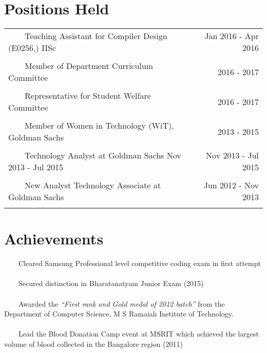 \documentclass[a4paper,10pt]{article} %
\newcommand{\tabitem}{~~\llap{\textbullet}~~}
\begin{document}

\section{Positions Held}

\begin{tabular}{p{12cm}r}
\tabitem Teaching Assistant for Compiler Design (E0256,) IISc  & Jan 2016 - Apr 2016 \\
&\\
\tabitem Member of Department Curriculum Committee &  2016 - 2017\\
&\\
\tabitem Representative for Student Welfare Committee  & 2016 - 2017\\
&\\
\tabitem Member of Women in Technology (WiT), Goldman Sachs  & 2013 - 2015\\
&\\
\tabitem Technology Analyst at Goldman Sachs Nov 2013 - Jul 2015 & Nov 2013 - Jul 2015 \\
&\\
\tabitem New Analyst Technology Associate at Goldman Sachs & Jun 2012 - Nov 2013 \\
&\\
\end{tabular}



\section{Achievements}
\tabitem Cleared Samsung Professional level competitive coding exam in first 
attempt \\
\\
\tabitem Secured distinction in Bharatanatyam Junior Exam (2015)  \\
\\
\tabitem Awarded the \textit{“First rank and Gold medal of 2012 batch”} from 
the Department of Computer Science, M S Ramaiah Institute of Technology.\\
\\
\tabitem Lead the Blood Donation Camp event at MSRIT which achieved the largest 
volume of blood collected in the Bangalore region (2011)\\
\\
\end{document}
